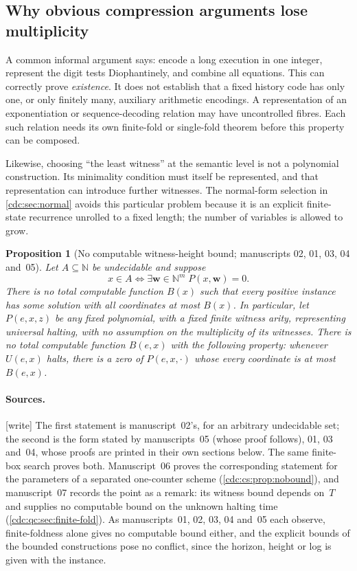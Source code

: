 \documentclass[11pt,a4paper]{article}
\newtheorem{proposition}[proposition]{Proposition}
\theoremstyle{definition}
\theoremstyle{remark}
\newcommand{\N}{\mathbb N}
\newcommand{\wtag}{\textup{[write]}}%
\begin{document}
\subsection{Why obvious compression arguments lose multiplicity}
A common informal argument says: encode a long execution in one integer, represent the digit tests Diophantinely, and combine all equations. This can correctly prove \emph{existence}. It does not establish that a fixed history code has only one, or only finitely many, auxiliary arithmetic encodings. A representation of an exponentiation or sequence-decoding relation may have uncontrolled fibres. Each such relation needs its own finite-fold or single-fold theorem before this property can be composed.

Likewise, choosing ``the least witness'' at the semantic level is not a polynomial construction. Its minimality condition must itself be represented, and that representation can introduce further witnesses. The normal-form selection in \cref{cdc:sec:normal} avoids this particular problem because it is an explicit finite-state recurrence unrolled to a fixed length; the number of variables is allowed to grow.


\begin{proposition}[No computable witness-height bound; manuscripts 02, 01, 03, 04 and~05]\label{cdc:bd:prop:nobound}\label{cdc:prop:noheight}\label{cdc:ct:prop:no-bound}\label{cdc:pt:prop:height}\label{cdc:mem:prop:no-bound}\label{cdc:wf:thm:height-obstruction}
Let $A\subseteq\N$ be undecidable and suppose
\[
 x\in A\iff\exists\boldsymbol w\in\N^m\;P(x,\boldsymbol w)=0 .
\]
There is no total computable function $B(x)$ such that every positive instance has \emph{some} solution with all coordinates at most $B(x)$. In particular, let $P(e,x,z)$ be any fixed polynomial, with a fixed finite witness arity, representing universal halting, with no assumption on the multiplicity of its witnesses. There is no total computable function $B(e,x)$ with the following property: whenever $U(e,x)$ halts, there is a zero of $P(e,x,\cdot)$ whose every coordinate is at most $B(e,x)$.
\end{proposition}

\paragraph{Sources.} \wtag{} The first statement is manuscript~02's, for an arbitrary undecidable set; the second is the form stated by manuscripts~05 (whose proof follows), 01, 03 and~04, whose proofs are printed in their own sections below. The same finite-box search proves both. Manuscript~06 proves the corresponding statement for the parameters of a separated one-counter scheme (\cref{cdc:cs:prop:nobound}), and manuscript~07 records the point as a remark: its witness bound depends on~$T$ and supplies no computable bound on the unknown halting time (\cref{cdc:qc:sec:finite-fold}). As manuscripts~01, 02, 03, 04 and~05 each observe, finite-foldness alone gives no computable bound either, and the explicit bounds of the bounded constructions pose no conflict, since the horizon, height or log is given with the instance.
\end{document}
